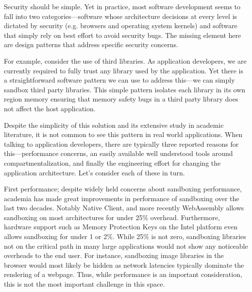
Security should be simple. Yet in practice, most software development seems to 
fall into two categories---software whose architecture decisions at every level 
is dictated by security (e.g. browsers and operating system kernels) and 
software that simply rely on best effort to avoid security bugs.
%
The missing element here are design patterns that address specific security 
concerns. 

For example, consider the use of third libraries.
%
As application developers, we are currently required to fully trust any library 
used by the application.
%
Yet there is a straightforward software pattern we can use to address this---we 
can simply sandbox third party libraries.
%
This simple pattern isolates each library in its own region memory ensuring 
that memory safety bugs in a third party library does not affect the host 
application.

Despite the simplicity of this solution and its extensive study in academic 
literature, it is not common to see this pattern in real world applications.
%
When talking to application developers, there are typically three reported 
reasons for this---performance concerns, an easily available well understood 
tools around compartmentalization, and finally the engineering effort for 
changing the application architecture.
%
Let's consider each of these in turn.

First performance; despite widely held concerns about sandboxing performance, 
academia has made great improvements in performance of sandboxing over 
the last two decades.
%
Notably Native Client, and more recently WebAssembly allows sandboxing on most 
architectures for under 25\% overhead.
%
Furthermore, hardware support such as Memory Protection Keys on the Intel 
platform even allows sandboxing for under 1 or 2\%.
%
While 25\% is not zero, sandboxing libraries not on the critical path in many 
large applications would not show any noticeable overheads to the end user.
%
For instance, sandboxing image libraries in the browser would most likely be 
hidden as network latencies typically dominate the rendering of a webpage.
%
Thus, while performance is an important consideration, this is not the most 
important challenge in this space.

